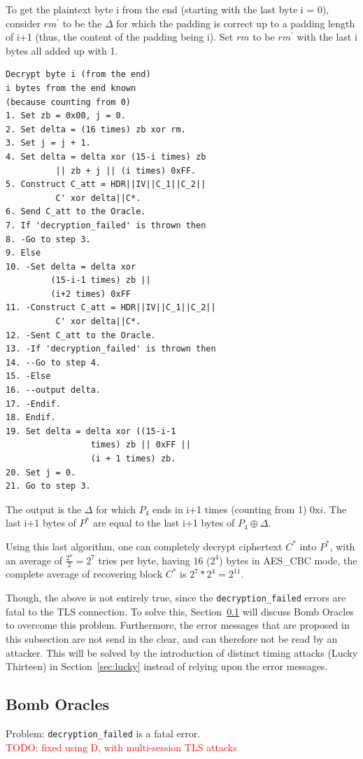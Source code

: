 \documentclass[10pt,conference,a4paper]{IEEEtran}
\begin{document}
To get the plaintext byte i from the end (starting with the last byte i = 0), consider $rm^{'}$ to be the $\Delta$ for which the padding is correct up to a padding length of i+1 (thus, the content of the padding being i). Set $rm$ to be $rm^{'}$ with the last i bytes all added up with 1.
\begin{verbatim}
Decrypt byte i (from the end)
i bytes from the end known
(because counting from 0)
1. Set zb = 0x00, j = 0.
2. Set delta = (16 times) zb xor rm.
3. Set j = j + 1.
4. Set delta = delta xor (15-i times) zb 
          || zb + j || (i times) 0xFF.
5. Construct C_att = HDR||IV||C_1||C_2||
          C' xor delta||C*.
6. Send C_att to the Oracle.
7. If 'decryption_failed' is thrown then
8. -Go to step 3.
9. Else
10. -Set delta = delta xor 
         (15-i-1 times) zb || 
         (i+2 times) 0xFF
11. -Construct C_att = HDR||IV||C_1||C_2||
          C' xor delta||C*.
12. -Sent C_att to the Oracle.
13. -If 'decryption_failed' is thrown then
14. --Go to step 4.
15. -Else
16. --output delta.
17. -Endif.
18. Endif.
19. Set delta = delta xor ((15-i-1 
                 times) zb || 0xFF || 
                 (i + 1 times) zb.
20. Set j = 0.
21. Go to step 3.
\end{verbatim}
The output is the $\Delta$ for which $P_4$ ends in i+1 times (counting from 1) $0\text{x}i$. The last i+1 bytes of $P^{*}$ are equal to the last i+1 bytes of $P_4 \oplus \Delta$.

Using this last algorithm, one can completely decrypt ciphertext $C^{*}$ into $P^{*}$, with an average of $\frac{2^8}{2} = 2^7$ tries per byte, having $16$ ($2^4$) bytes in AES\_CBC mode, the complete average of recovering block $C^{*}$ is $2^7 * 2^4 = 2^{11}$.

Though, the above is not entirely true, since the \texttt{decryption\_failed} errors are fatal to the TLS connection. To solve this, Section~\ref{sec:paddingoracle:bomb} will discuss Bomb Oracles to overcome this problem. Furthermore, the error messages that are proposed in this subsection are not send in the clear, and can therefore not be read by an attacker. This will be solved by the introduction of distinct timing attacks (Lucky Thirteen) in Section~\ref{sec:lucky} instead of relying upon the error messages.

\subsection{Bomb Oracles}
\label{sec:paddingoracle:bomb}
Problem: \texttt{decryption\_failed} is a fatal error. \\
\textcolor{red}{TODO: fixed using D, with multi-session TLS attacks}
\end{document}

